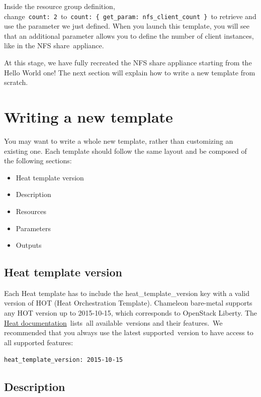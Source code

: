 Inside the resource group definition,
change~\texttt{count:\ 2}~to~\texttt{count:\ \{\ get\_param:\ nfs\_client\_count\ \}}~to
retrieve and use the parameter we just defined. When you launch this
template, you will see that an additional parameter allows you to define
the number of client instances, like in the NFS share~appliance.

At this stage, we have fully recreated the NFS share appliance starting
from the Hello World one! The next section will explain how to write a
new template from scratch.

\section{Writing a new template}\label{writing-a-new-template}

You may want to write a whole new template, rather than customizing an
existing one. Each template should follow the same layout and be
composed of the following sections:

\begin{itemize}
\item
  Heat template version
\item
  Description
\item
  Resources
\item
  Parameters
\item
  Outputs
\end{itemize}

\subsection{Heat template version}\label{heat-template-version}

Each Heat template has to include the heat\_template\_version key with a
valid version of HOT (Heat Orchestration Template). Chameleon bare-metal
supports any HOT version up to 2015-10-15, which corresponds to
OpenStack Liberty. The
\href{http://docs.openstack.org/developer/heat/template_guide/hot_spec.html\#hot-spec-template-version}{Heat
documentation}~lists~all available~versions and their features.~We
recommended that you always use the latest supported~version to have
access to all supported features:

\texttt{heat\_template\_version:\ 2015-10-15}

\subsection{Description}\label{description}

